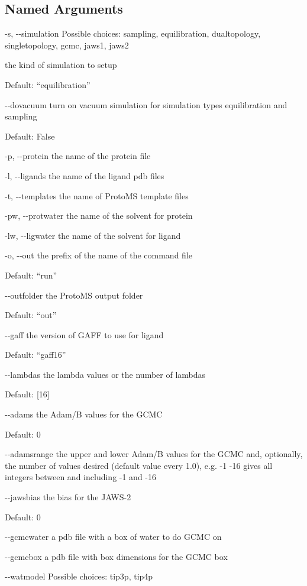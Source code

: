 \documentclass[letterpaper,10pt,english]{sphinxmanual}
\begin{document}
\subsection{Named Arguments}
\label{\detokenize{tools:Named Arguments}}\begin{optionlist}{3cm}
\item [-s, -{-}simulation]  
Possible choices: sampling, equilibration, dualtopology, singletopology, gcmc, jaws1, jaws2

the kind of simulation to setup

Default: “equilibration”
\item [-{-}dovacuum]  
turn on vacuum simulation for simulation types equilibration and sampling

Default: False
\item [-p, -{-}protein]  
the name of the protein file
\item [-l, -{-}ligands]  
the name of the ligand pdb files
\item [-t, -{-}templates]  
the name of ProtoMS template files
\item [-pw, -{-}protwater]  
the name of the solvent for protein
\item [-lw, -{-}ligwater]  
the name of the solvent for ligand
\item [-o, -{-}out]  
the prefix of the name of the command file

Default: “run”
\item [-{-}outfolder]  
the ProtoMS output folder

Default: “out”
\item [-{-}gaff]  
the version of GAFF to use for ligand

Default: “gaff16”
\item [-{-}lambdas]  
the lambda values or the number of lambdas

Default: {[}16{]}
\item [-{-}adams]  
the Adam/B values for the GCMC

Default: 0
\item [-{-}adamsrange]  
the upper and lower Adam/B values for the GCMC and, optionally, the number of values desired (default value every 1.0), e.g. -1 -16 gives all integers between and including -1 and -16
\item [-{-}jawsbias]  
the bias for the JAWS-2

Default: 0
\item [-{-}gcmcwater]  
a pdb file with a box of water to do GCMC on
\item [-{-}gcmcbox]  
a pdb file with box dimensions for the GCMC box
\item [-{-}watmodel]  
Possible choices: tip3p, tip4p


\end{optionlist}
\end{document}
